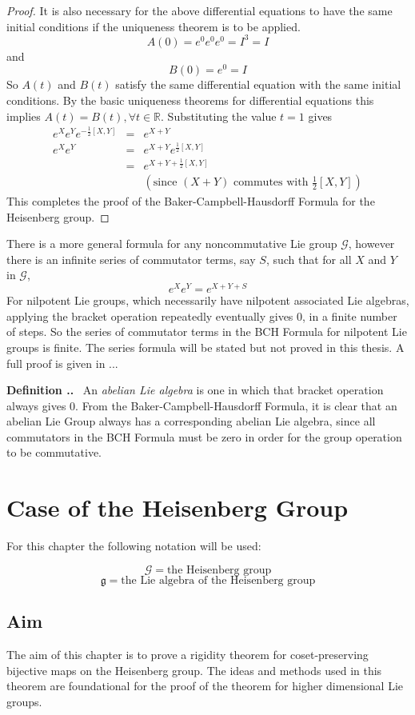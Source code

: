 \documentclass[honours]{UNSWthesis}
\newcommand{\R}{\mathbb{R}}
\newcommand{\G}{\mathcal{G}}
\newcommand{\g}{\mathfrak{g}}
\newcommand{\1}{\mathbf{e}_{1}}
\newcommand{\2}{\mathbf{e}_{3}}
\newcommand{\3}{\mathbf{e}_{3}}
\newcounter{Item}[section]
\newenvironment{Definition}{\medskip
                            \refstepcounter{Item}
                            \noindent
                           {\bf Definition \thesection.\theItem.}\ }
                           {\medskip}
\begin{document}
\begin{proof}
It is also necessary for the above differential equations to have the same initial conditions if the uniqueness theorem is to be applied. 
\[
A(0)=e^{0}e^{0}e^{0}=I^{3}=I
\]
and 
\[
B(0)=e^{0}=I
\]
So $A(t)$ and $B(t)$ satisfy the same differential equation with the same initial conditions. By the basic uniqueness theorems for differential equations this implies $A(t)=B(t), \forall t \in \R$. Substituting the value $t=1$ gives 
\begin{eqnarray*}
e^{X}e^{Y}e^{-\frac{1}{2}[X,Y]} &=&e^{X+Y} \\
e^{X}e^{Y} &=& e^{X+Y}e^{\frac{1}{2}[X,Y]} \\
&=& e^{X+Y+\frac{1}{2}[X,Y]} \\
& & (\text{since $(X+Y)$ commutes with $\frac{1}{2}[X,Y]$})
\end{eqnarray*}
This completes the proof of the Baker-Campbell-Hausdorff Formula for the Heisenberg group. 
\end{proof}

There is a more general formula for any noncommutative Lie group $\G$, however there is an infinite series of commutator terms, say $S$, such that for all $X$ and $Y$ in $\G$,
\[
e^{X}e^{Y}=e^{X+Y+S}
\]
For nilpotent Lie groups, which necessarily have nilpotent associated Lie algebras, applying the bracket operation repeatedly eventually gives $0$, in a finite number of steps. So the series of commutator terms in the BCH Formula for nilpotent Lie groups is finite.
The series formula will be stated but not proved in this thesis. A full proof is given in ...

\begin{Definition}
An \emph{abelian Lie algebra} is one in which that bracket operation always gives $0$. From the Baker-Campbell-Hausdorff Formula, it is clear that an abelian Lie Group always has a corresponding abelian Lie algebra, since all commutators in the BCH Formula must be zero in order for the group operation to be commutative. 
\end{Definition}


\chapter{Case of the Heisenberg Group}
For this chapter the following notation will be used:

$$\G=\text{the Heisenberg group}$$
$$\g=\text{the Lie algebra of the Heisenberg group}$$

\section{Aim}
The aim of this chapter is to prove a rigidity theorem for coset-preserving bijective maps on the Heisenberg group. The ideas and methods used in this theorem are foundational for the proof of the theorem for higher dimensional Lie groups. 
\end{document}
